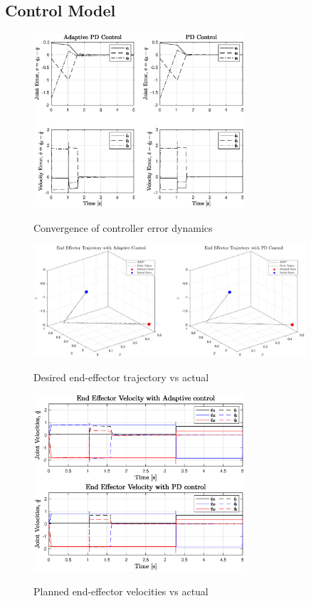 \subsection*{Control Model}
\begin{figure}[H]
	\centering
	\includegraphics[width=0.7\textwidth]{figures/adpdErr.eps}
	\label{fig:adpdErr}
	\caption{Convergence of controller error dynamics}
\end{figure}

\begin{figure}[H]
	\centering
	\includegraphics[width=0.9\textwidth]{figures/eeTraj.eps}
	\label{fig:eeTraj}
	\caption{Desired end-effector trajectory vs actual}
\end{figure}

\begin{figure}[H]
	\centering
	\includegraphics[width=0.7\textwidth]{figures/eeVel.eps}
	\label{fig:eeVel}
	\caption{Planned end-effector velocities vs actual}
\end{figure}